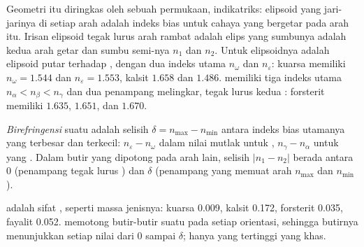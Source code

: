 Geometri itu diringkas oleh sebuah permukaan, indikatriks: elipsoid yang jari-jarinya di setiap arah adalah indeks bias untuk cahaya yang bergetar pada arah itu. Irisan elipsoid tegak lurus arah rambat adalah elips yang sumbunya adalah kedua arah getar dan sumbu semi-nya $n_1$ dan $n_2$. Untuk   elipsoidnya adalah elipsoid putar terhadap , dengan dua indeks utama $n_\omega$ dan $n_\varepsilon$: kuarsa memiliki $n_\omega = 1.544$ dan $n_\varepsilon = 1.553$, kalsit $1.658$ dan $1.486$.
  memiliki tiga indeks utama $n_\alpha < n_\beta < n_\gamma$ dan dua penampang melingkar, tegak lurus kedua : forsterit memiliki $1.635$, $1.651$, dan $1.670$.

\begin{definition}\label{def:b1:optical-mineralogy:birefringence}
\emph{Birefringensi} suatu  adalah selisih $\delta = n_{\max} - n_{\min}$ antara indeks bias utamanya yang terbesar dan terkecil: $n_\varepsilon - n_\omega$ dalam nilai mutlak untuk  , $n_\gamma - n_\alpha$ untuk yang . Dalam butir yang dipotong pada arah lain, selisih $|n_1 - n_2|$ berada antara 0 (penampang tegak lurus ) dan $\delta$ (penampang yang memuat arah $n_{\max}$ dan $n_{\min}$).
\end{definition}

 adalah sifat , seperti massa jenisnya: kuarsa \num{0.009}, kalsit \num{0.172}, forsterit \num{0.035}, fayalit
\num{0.052}.  memotong butir-butir suatu  pada setiap orientasi, sehingga butirnya menunjukkan setiap nilai dari 0 sampai $\delta$; hanya yang tertinggi yang khas.

